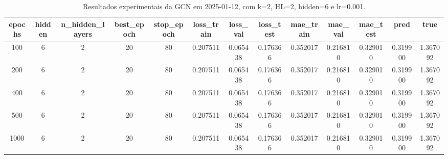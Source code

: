 \begin{table}[h]
\centering
\caption{Resultados experimentais da GCN em 2025-01-12, com k=2, HL=2, hidden=6 e lr=0.001.}
\label{tab:gcn_results_k2_hl2_h6_d20250112}
\begin{tabular}{ccccccccccccc}
\toprule
epochs & hidden & n\_hidden\_layers & best\_epoch & stop\_epoch & loss\_train & loss\_val & loss\_test & mae\_train & mae\_val & mae\_test & pred & true \\
\midrule
100 & 6 & 2 & 20 & 80 & 0.207511 & 0.065438 & 0.176366 & 0.352017 & 0.216810 & 0.329010 & 0.319900 & 1.367092 \\
200 & 6 & 2 & 20 & 80 & 0.207511 & 0.065438 & 0.176366 & 0.352017 & 0.216810 & 0.329010 & 0.319900 & 1.367092 \\
400 & 6 & 2 & 20 & 80 & 0.207511 & 0.065438 & 0.176366 & 0.352017 & 0.216810 & 0.329010 & 0.319900 & 1.367092 \\
500 & 6 & 2 & 20 & 80 & 0.207511 & 0.065438 & 0.176366 & 0.352017 & 0.216810 & 0.329010 & 0.319900 & 1.367092 \\
1000 & 6 & 2 & 20 & 80 & 0.207511 & 0.065438 & 0.176366 & 0.352017 & 0.216810 & 0.329010 & 0.319900 & 1.367092 \\
\bottomrule
\end{tabular}
\end{table}
